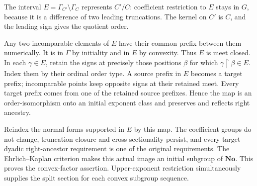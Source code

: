 \documentclass[11pt]{article}
\theoremstyle{definition}
\theoremstyle{remark}
\newcommand{\No}{\ensuremath{\mathbf{No}}}
\begin{document}
The interval $E=\Gamma_{C'}\setminus\Gamma_C$ represents $C'/C$:
coefficient restriction to $E$ stays in $G$, because it is a difference
of two leading truncations. The kernel on $C'$ is $C$, and the
leading sign gives the quotient order.

Any two incomparable elements of $E$ have their common prefix between
them numerically. It is in $\Gamma$ by initiality and in $E$ by
convexity. Thus $E$ is meet closed. In each $\gamma\in E$, retain the
signs at precisely those positions $\beta$ for which
$\gamma\restriction\beta\in E$. Index them by their ordinal order
type. A source prefix in $E$ becomes a target prefix; incomparable
points keep opposite signs at their retained meet. Every target prefix
comes from one of the retained source prefixes. Hence the map is an
order-isomorphism onto an initial exponent class and preserves and
reflects right ancestry.

Reindex the normal forms supported in $E$ by this map. The coefficient
groups do not change, truncation closure and cross-sectionality persist,
and every target dyadic right-ancestor requirement is one of the
original requirements. The Ehrlich--Kaplan criterion makes this actual
image an initial subgroup of $\No$. This proves the convex-factor
assertion. Upper-exponent restriction simultaneously supplies the split
section for each convex subgroup sequence.
\end{document}
